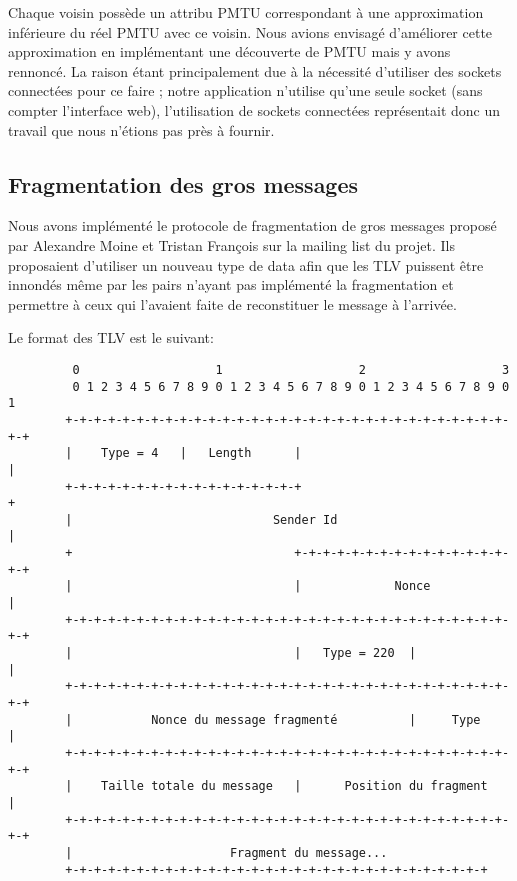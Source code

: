 \documentclass[a4paper,10pt]{article} %
\begin{document}
Chaque voisin possède un attribu \textrm{PMTU} correspondant à une approximation inférieure du réel \textrm{PMTU} avec ce voisin. Nous avions envisagé d'améliorer cette approximation en implémentant une découverte de PMTU mais y avons rennoncé. La raison étant principalement due à la nécessité d'utiliser des sockets connectées pour ce faire ; notre application n'utilise qu'une seule socket (sans compter l'interface web), l'utilisation de sockets connectées représentait donc un travail que nous n'étions pas près à fournir.


\subsection{Fragmentation des gros messages\label{sec:frag}}
Nous avons implémenté le protocole de fragmentation de gros messages proposé par \textrm{Alexandre Moine} et \textrm{Tristan François} sur la mailing list du projet. Ils proposaient d'utiliser un nouveau type de data afin que les TLV puissent être innondés même par les pairs n'ayant pas implémenté la fragmentation et permettre à ceux qui l'avaient faite de reconstituer le message à l'arrivée.

Le format des TLV est le suivant:

\begin{verbatim}
         0                   1                   2                   3
         0 1 2 3 4 5 6 7 8 9 0 1 2 3 4 5 6 7 8 9 0 1 2 3 4 5 6 7 8 9 0 1
        +-+-+-+-+-+-+-+-+-+-+-+-+-+-+-+-+-+-+-+-+-+-+-+-+-+-+-+-+-+-+-+-+
        |    Type = 4   |   Length      |                               |
        +-+-+-+-+-+-+-+-+-+-+-+-+-+-+-+-+                               +
        |                            Sender Id                          |
        +                               +-+-+-+-+-+-+-+-+-+-+-+-+-+-+-+-+
        |                               |             Nonce             |
        +-+-+-+-+-+-+-+-+-+-+-+-+-+-+-+-+-+-+-+-+-+-+-+-+-+-+-+-+-+-+-+-+
        |                               |   Type = 220  |               |
        +-+-+-+-+-+-+-+-+-+-+-+-+-+-+-+-+-+-+-+-+-+-+-+-+-+-+-+-+-+-+-+-+
        |           Nonce du message fragmenté          |     Type      |
        +-+-+-+-+-+-+-+-+-+-+-+-+-+-+-+-+-+-+-+-+-+-+-+-+-+-+-+-+-+-+-+-+
        |    Taille totale du message   |      Position du fragment     |
        +-+-+-+-+-+-+-+-+-+-+-+-+-+-+-+-+-+-+-+-+-+-+-+-+-+-+-+-+-+-+-+-+
        |                      Fragment du message...
        +-+-+-+-+-+-+-+-+-+-+-+-+-+-+-+-+-+-+-+-+-+-+-+-+-+-+-+-+-+
\end{verbatim}
\end{document}
